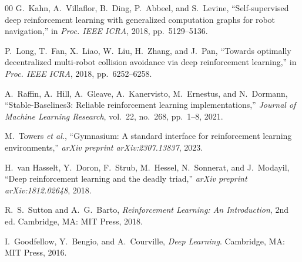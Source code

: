 \documentclass[conference]{IEEEtran}
\begin{document}
\begin{thebibliography}{00}
G.~Kahn, A.~Villaflor, B.~Ding, P.~Abbeel, and S.~Levine,
``Self-supervised deep reinforcement learning with generalized computation graphs for robot navigation,''
in \textit{Proc. IEEE ICRA}, 2018, pp.~5129--5136.

P.~Long, T.~Fan, X.~Liao, W.~Liu, H.~Zhang, and J.~Pan,
``Towards optimally decentralized multi-robot collision avoidance via deep reinforcement learning,''
in \textit{Proc. IEEE ICRA}, 2018, pp.~6252--6258.

A.~Raffin, A.~Hill, A.~Gleave, A.~Kanervisto, M.~Ernestus, and N.~Dormann,
``Stable-Baselines3: Reliable reinforcement learning implementations,''
\textit{Journal of Machine Learning Research}, vol.~22, no.~268, pp.~1--8, 2021.

M.~Towers \textit{et al.}, ``Gymnasium: A standard interface for reinforcement learning environments,''
\textit{arXiv preprint arXiv:2307.13837}, 2023.

H.~van Hasselt, Y.~Doron, F.~Strub, M.~Hessel, N.~Sonnerat, and J.~Modayil,
``Deep reinforcement learning and the deadly triad,''
\textit{arXiv preprint arXiv:1812.02648}, 2018.

R.~S.~Sutton and A.~G.~Barto,
\textit{Reinforcement Learning: An Introduction}, 2nd ed.
Cambridge, MA: MIT Press, 2018.

I.~Goodfellow, Y.~Bengio, and A.~Courville,
\textit{Deep Learning}.
Cambridge, MA: MIT Press, 2016.

\end{thebibliography}
\end{document}
